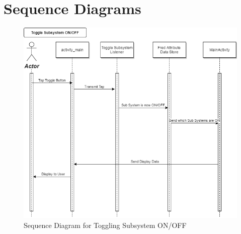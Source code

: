 \documentclass[]{article}
\begin{document}

\section{Sequence Diagrams}
\label{sec:sequence_diagrams}
\begin{figure}[H]
	\centering
	\includegraphics[width=0.7\linewidth]{../Resources/Toggle_Subsystem_Sequence_Diagram.png}
	\caption{Sequence Diagram for Toggling Subsystem ON/OFF}
\end{figure}
\end{document}
